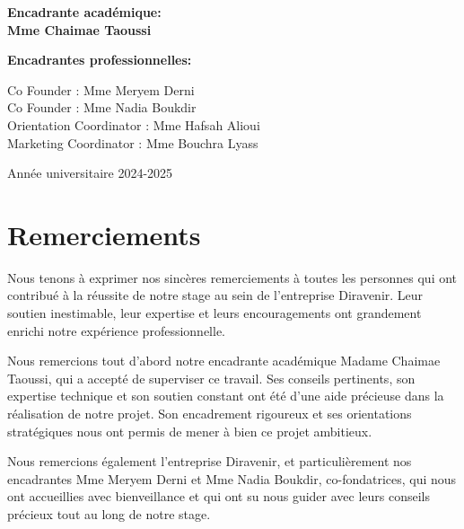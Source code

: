 \documentclass[12pt,a4paper]{report}
\begin{document}
\begin{titlepage}
    \vspace{2cm}
    
    \centering
    \large\bfseries Encadrante académique:\\
    \large\bfseries Mme Chaimae Taoussi
    
    \vspace{1cm}
    
    \centering
    \large\bfseries Encadrantes professionnelles:
        
        \vspace{0.4cm}
        
    \centering
    Co Founder : Mme Meryem Derni\\
    Co Founder : Mme Nadia Boukdir\\
    Orientation Coordinator : Mme Hafsah Alioui\\
    Marketing Coordinator : Mme Bouchra Lyass
    
    \vfill
    
    {\large Année universitaire 2024-2025}
    
\end{titlepage}

\tableofcontents
\newpage

\listoffigures
\newpage

\chapter*{Remerciements}

Nous tenons à exprimer nos sincères remerciements à toutes les personnes qui ont contribué à la réussite de notre stage au sein de l'entreprise Diravenir. Leur soutien inestimable, leur expertise et leurs encouragements ont grandement enrichi notre expérience professionnelle.

Nous remercions tout d'abord notre encadrante académique Madame Chaimae Taoussi, qui a accepté de superviser ce travail. Ses conseils pertinents, son expertise technique et son soutien constant ont été d'une aide précieuse dans la réalisation de notre projet. Son encadrement rigoureux et ses orientations stratégiques nous ont permis de mener à bien ce projet ambitieux.

Nous remercions également l'entreprise Diravenir, et particulièrement nos encadrantes Mme Meryem Derni et Mme Nadia Boukdir, co-fondatrices, qui nous ont accueillies avec bienveillance et qui ont su nous guider avec leurs conseils précieux tout au long de notre stage.
\end{document}
